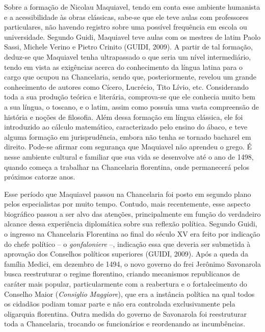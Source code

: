 Sobre a formação de Nicolau Maquiavel, tendo em conta esse ambiente
humanista e a acessibilidade às obras clássicas, sabe-se que ele teve
aulas com professores particulares, não havendo registro sobre uma
possível frequência em escola ou universidade. Segundo Guidi, Maquiavel
teve aulas com os mestres de latim Paolo Sassi, Michele Verino e Pietro
Crinito (GUIDI, 2009). A partir de tal formação, deduz-se que Maquiavel
tenha ultrapassado o que seria um nível intermediário, tendo em vista as
exigências acerca do conhecimento da língua latina para o cargo que
ocupou na Chancelaria, sendo que, posteriormente, revelou um grande
conhecimento de autores como Cícero, Lucrécio, Tito Lívio, etc.
Considerando toda a sua produção teórica e literária, comprova-se que
ele conhecia muito bem a sua língua, o toscano, e o latim, assim como
possuía uma vasta compreensão de história e noções de filosofia. Além
dessa formação em língua clássica, ele foi introduzido ao cálculo
matemático, caracterizado pelo ensino do ábaco, e teve alguma formação
em jurisprudência, embora não tenha se tornado bacharel em direito.
Pode-se afirmar com segurança que Maquiavel não aprendeu o grego. É
nesse ambiente cultural e familiar que sua vida se desenvolve até o ano
de 1498, quando começa a trabalhar na Chancelaria florentina, onde
permanecerá pelos próximos catorze anos.

Esse período que Maquiavel passou na Chancelaria foi posto em segundo
plano pelos especialistas por muito tempo. Contudo, mais recentemente,
esse aspecto biográfico passou a ser alvo das atenções, principalmente
em função do verdadeiro alcance dessa experiência diplomática sobre sua
reflexão política. Segundo Guidi, o ingresso na Chancelaria Florentina
ao final do século XV era feito por indicação do chefe político -- o
\emph{gonfaloniere} --, indicação essa que deveria ser submetida à
aprovação dos Conselhos políticos superiores (GUIDI, 2009). Após a queda
da família Medici, em dezembro de 1494, o novo governo do frei Jerônimo
Savonarola busca reestruturar o regime florentino, criando mecanismos
republicanos de caráter mais popular, particularmente com a reabertura e
o fortalecimento do Conselho Maior (\emph{Consiglio Maggiore}), que era
a instância política na qual todos os cidadãos podiam tomar parte e não
era controlada exclusivamente pela oligarquia florentina. Outra medida
do governo de Savonarola foi reestruturar toda a Chancelaria, trocando
os funcionários e reordenando as incumbências.

